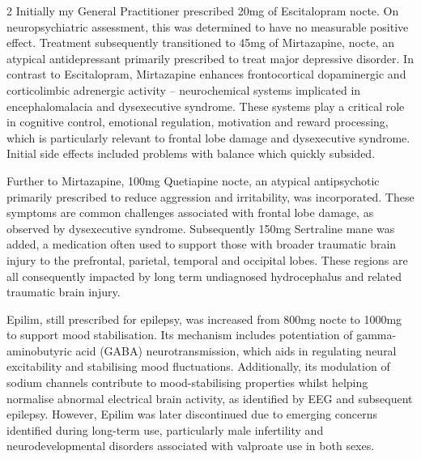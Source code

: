 \documentclass{article}
\begin{document}
\begin{multicols}{2}
Initially my General Practitioner prescribed 20mg of Escitalopram nocte. On neuropsychiatric assessment, this was determined to have no measurable positive effect. Treatment subsequently transitioned to 45mg of Mirtazapine, nocte, an atypical antidepressant primarily prescribed to treat major depressive disorder. In contrast to Escitalopram, Mirtazapine enhances frontocortical dopaminergic and corticolimbic adrenergic activity – neurochemical systems implicated in encephalomalacia and dysexecutive syndrome. These systems play a critical role in cognitive control, emotional regulation, motivation and reward processing, which is particularly relevant to frontal lobe damage and dysexecutive syndrome.\cite{deboer2000} Initial side effects included problems with balance which quickly subsided.

Further to Mirtazapine, 100mg Quetiapine nocte, an atypical antipsychotic primarily prescribed to reduce aggression and irritability, was incorporated. These symptoms are common challenges associated with frontal lobe damage, as observed by dysexecutive syndrome\cite{kim2006}. Subsequently 150mg Sertraline mane was added, a medication often used to support those with broader traumatic brain injury to the prefrontal, parietal, temporal and occipital lobes\cite{ansari2014}. These regions are all consequently impacted by long term undiagnosed hydrocephalus and related traumatic brain injury.

Epilim, still prescribed for epilepsy, was increased from 800mg nocte to 1000mg to support mood stabilisation. Its mechanism includes potentiation of gamma-aminobutyric acid (GABA) neurotransmission, which aids in regulating neural excitability and stabilising mood fluctuations. Additionally, its modulation of sodium channels contribute to mood-stabilising properties whilst helping normalise abnormal electrical brain activity, as identified by EEG and subsequent epilepsy.\cite{loscher2002} However, Epilim was later discontinued due to emerging concerns identified during long-term use, particularly male infertility and neurodevelopmental disorders associated with valproate use in both sexes.\cite{tallon2021,roste2003,veiby2020,christensen2024}


\end{multicols}
\end{document}
